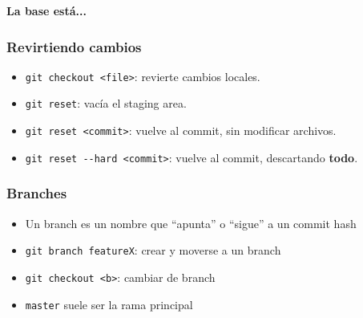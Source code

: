 \documentclass[a4paper, 12pt, aspectratio=169,
\ifhandout handout \else \fi
]{beamer}
\begin{document}
\begin{frame}[fragile]
    \begin{center}
        \Huge \bf La base está...
    \end{center}
\end{frame}

\begin{frame}[fragile]
    \frametitle{Revirtiendo cambios}
    \begin{itemize}
        \item \lstinline`git checkout <file>`: revierte cambios locales.
        \item \lstinline`git reset`: vacía el staging area.
        \item \lstinline`git reset <commit>`: vuelve al commit, sin modificar archivos.
        \item \lstinline`git reset --hard <commit>`: vuelve al commit, descartando
            \textbf{todo}.
    \end{itemize}
\end{frame}

\begin{frame}
    \frametitle{Branches}
    \begin{itemize}
        \item Un branch es un nombre que ``apunta'' o ``sigue'' a un commit hash
        \item \lstinline`git branch featureX`: crear y moverse a un branch
        \item \lstinline`git checkout <b>`: cambiar de branch
        \item \lstinline`master` suele ser la rama principal
    \end{itemize}
\end{frame}
\end{document}
